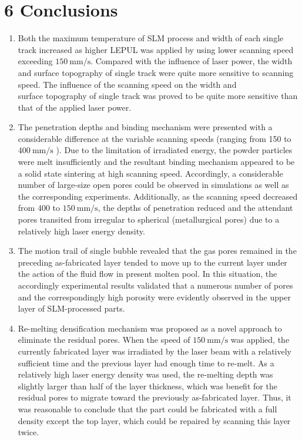 \documentclass[10pt]{article}
\begin{document}
\section*{6 Conclusions}
\begin{enumerate}
  \item Both the maximum temperature of SLM process and width of each single track increased as higher LEPUL was applied by using lower scanning speed exceeding $150 \mathrm{~mm} / \mathrm{s}$. Compared with the influence of laser power, the width and surface topography of single track were quite more sensitive to scanning speed. The influence of the scanning speed on the width and\\
surface topography of single track was proved to be quite more sensitive than that of the applied laser power.

  \item The penetration depths and binding mechanism were presented with a considerable difference at the variable scanning speeds (ranging from 150 to $400 \mathrm{~mm} / \mathrm{s}$ ). Due to the limitation of irradiated energy, the powder particles were melt insufficiently and the resultant binding mechanism appeared to be a solid state sintering at high scanning speed. Accordingly, a considerable number of large-size open pores could be observed in simulations as well as the corresponding experiments. Additionally, as the scanning speed decreased from 400 to $150 \mathrm{~mm} / \mathrm{s}$, the depths of penetration reduced and the attendant pores transited from irregular to spherical (metallurgical pores) due to a relatively high laser energy density.

  \item The motion trail of single bubble revealed that the gas pores remained in the preceding as-fabricated layer tended to move up to the current layer under the action of the fluid flow in present molten pool. In this situation, the accordingly experimental results validated that a numerous number of pores and the correspondingly high porosity were evidently observed in the upper layer of SLM-processed parts.

  \item Re-melting densification mechanism was proposed as a novel approach to eliminate the residual pores. When the speed of $150 \mathrm{~mm} / \mathrm{s}$ was applied, the currently fabricated layer was irradiated by the laser beam with a relatively sufficient time and the previous layer had enough time to re-melt. As a relatively high laser energy density was used, the re-melting depth was slightly larger than half of the layer thickness, which was benefit for the residual pores to migrate toward the previously as-fabricated layer. Thus, it was reasonable to conclude that the part could be fabricated with a full density except the top layer, which could be repaired by scanning this layer twice.

\end{enumerate}
\end{document}

